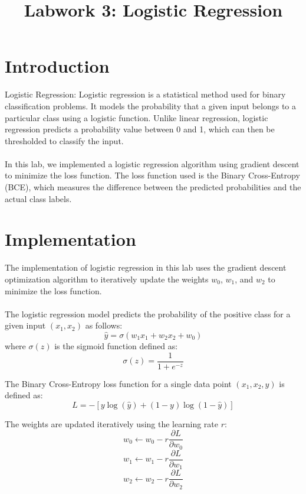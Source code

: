 \documentclass{article}
\title{Labwork 3: Logistic Regression}
\begin{document}
\maketitle

\setlength\parindent{0pt}

\section{Introduction}

Logistic Regression:
Logistic regression is a statistical method used for binary classification problems. It models the 
probability that a given input belongs to a particular class using a logistic function. Unlike linear 
regression, logistic regression predicts a probability value between 0 and 1, which can then be 
thresholded to classify the input.\\
\\
In this lab, we implemented a logistic regression algorithm using gradient descent to minimize the 
loss function. The loss function used is the Binary Cross-Entropy (BCE), which measures the difference 
between the predicted probabilities and the actual class labels.

\section{Implementation}

The implementation of logistic regression in this lab uses the gradient descent optimization algorithm 
to iteratively update the weights $w_0$, $w_1$, and $w_2$ to minimize the loss function.\\
\\
The logistic regression model predicts the probability of the positive class for a given input $(x_1, x_2)$ 
as follows:\\
\[\hat{y} = \sigma(w_1 x_1 + w_2 x_2 + w_0)\]
where $\sigma(z)$ is the sigmoid function defined as:
\[\sigma(z) = \frac{1}{1 + e^{-z}}\]

The Binary Cross-Entropy loss function for a single data point $(x_1, x_2, y)$ is defined as:\\
\[L = -\left[y \log(\hat{y}) + (1 - y) \log(1 - \hat{y})\right]\]

The weights are updated iteratively using the learning rate $r$:\\
\[w_0 \leftarrow w_0 - r \frac{\partial L}{\partial w_0}\]
\[w_1 \leftarrow w_1 - r \frac{\partial L}{\partial w_1}\]
\[w_2 \leftarrow w_2 - r \frac{\partial L}{\partial w_2}\]
\end{document}

